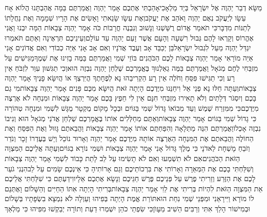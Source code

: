 \documentclass[../main/main.tex]{subfiles}
\begin{document}
\begin{multicols*}{\ncols}
מַשָּׂא דְבַר יַהְוֶה אֶל יִשְׂרָאֵל בְּיַד מַלְאָכִי\PreVerseSpace{}אָהַבְתִּי אֶתְכֶם אָמַר יַהְוֶה וַאֲמַרְתֶּם בַּמָּה אֲהַבְתָּנוּ הֲלוֹא אָח עֵשָׂו לְיַעֲקֹב נְאֻם יַהְוֶה וָאֹהַב אֶת יַעֲקֹב\PreVerseSpace{}וְאֶת עֵשָׂו שָׂנֵאתִי וָאָשִׂים אֶת הָרָיו שְׁמָמָה וְאֶת נַחֲלָתוֹ לְתַנּוֹת מִדְבָּר\PreVerseSpace{}כִּי תֹאמַר אֱדוֹם רֻשַּׁשְׁנוּ וְנָשׁוּב וְנִבְנֶה חֳרָבוֹת כֹּה אָמַר יַהְוֶה צְבָאוֹת הֵמָּה יִבְנוּ וַאֲנִי אֶהֱרוֹס וְקָרְאוּ לָהֶם גְּבוּל רִשְׁעָה וְהָעָם אֲשֶׁר זָעַם יַהְוֶה עַד עוֹלָם\PreVerseSpace{}וְעֵינֵיכֶם תִּרְאֶינָה וְאַתֶּם תֹּאמְרוּ יִגְדַּל יַהְוֶה מֵעַל לִגְבוּל יִשְׂרָאֵל\PreVerseSpace{}בֵּן יְכַבֵּד אָב וְעֶבֶד אֲדֹנָיו וְאִם אָב אָנִי אַיֵּה כְבוֹדִי וְאִם אֲדוֹנִים אָנִי אַיֵּה מוֹרָאִי אָמַר יַהְוֶה צְבָאוֹת לָכֶם הַכֹּהֲנִים בּוֹזֵי שְׁמִי וַאֲמַרְתֶּם בַּמֶּה בָזִינוּ אֶת שְׁמֶךָ\PreVerseSpace{}מַגִּישִׁים עַל מִזְבְּחִי לֶחֶם מְגֹאָל וַאֲמַרְתֶּם בַּמֶּה גֵאַלְנוּךָ בֶּאֱמָרְכֶם שֻׁלְחַן יַהְוֶה נִבְזֶה הוּא\PreVerseSpace{}וְכִי תַגִּשׁוּן עִוֵּר לִזְבֹּחַ אֵין רָע וְכִי תַגִּישׁוּ פִּסֵּחַ וְחֹלֶה אֵין רָע הַקְרִיבֵהוּ נָא לְפֶחָתֶךָ הֲיִּרְצְךָ אוֹ הֲיִשָּׂא פָנֶיךָ אָמַר יַהְוֶה צְבָאוֹת\PreVerseSpace{}וְעַתָּה חַלּוּ נָא פְנֵי אֵל וִיחֵנֵּנוּ מִיֶּדְכֶם הָיְתָה זֹּאת הֲיִשָּׂא מִכֶּם פָּנִים אָמַר יַהְוֶה צְבָאוֹת\PreVerseSpace{}מִי גַם בָּכֶם וְיִסְגֹּר דְּלָתַיִם וְלֹא תָאִירוּ מִזְבְּחִי חִנָּם אֵין לִי חֵפֶץ בָּכֶם אָמַר יַהְוֶה צְבָאוֹת וּמִנְחָה לֹא אֶרְצֶה מִיֶּדְכֶם\PreVerseSpace{}כִּי מִמִּזְרַח שֶׁמֶשׁ וְעַד מְבוֹאוֹ גָּדוֹל שְׁמִי בַּגּוֹיִם וּבְכָל מָקוֹם מֻקְטָר מֻגָּשׁ לִשְׁמִי וּמִנְחָה טְהוֹרָה כִּי גָדוֹל שְׁמִי בַּגּוֹיִם אָמַר יַהְוֶה צְבָאוֹת\PreVerseSpace{}וְאַתֶּם מְחַלְּלִים אוֹתוֹ בֶּאֱמָרְכֶם שֻׁלְחַן אֲדֹנַי מְגֹאָל הוּא וְנִיבוֹ נִבְזֶה אָכְלוֹ\PreVerseSpace{}וַאֲמַרְתֶּם הִנֵּה מַתְּלָאָה וְהִפַּחְתֶּם אוֹתוֹ אָמַר יַהְוֶה צְבָאוֹת וַהֲבֵאתֶם גָּזוּל וְאֶת הַפִּסֵּחַ וְאֶת הַחוֹלֶה וַהֲבֵאתֶם אֶת הַמִּנְחָה הַאֶרְצֶה אוֹתָהּ מִיֶּדְכֶם אָמַר יַהְוֶה \ClosedSection{}וְאָרוּר נוֹכֵל וְיֵשׁ בְּעֶדְרוֹ זָכָר וְנֹדֵר וְזֹבֵחַ מָשְׁחָת לַאדֹנָי כִּי מֶלֶךְ גָּדוֹל אָנִי אָמַר יַהְוֶה צְבָאוֹת וּשְׁמִי נוֹרָא בַגּוֹיִם\PreChapterSpace{}וְעַתָּה אֲלֵיכֶם הַמִּצְוָה הַזֹּאת הַכֹּהֲנִים\PreVerseSpace{}אִם לֹא תִשְׁמְעוּ וְאִם לֹא תָשִׂימוּ עַל לֵב לָתֵת כָּבוֹד לִשְׁמִי אָמַר יַהְוֶה צְבָאוֹת וְשִׁלַּחְתִּי בָכֶם אֶת הַמְּאֵרָה וְאָרוֹתִי אֶת בִּרְכוֹתֵיכֶם וְגַם אָרוֹתִיהָ כִּי אֵינְכֶם שָׂמִים עַל לֵב\PreVerseSpace{}הִנְנִי גֹעֵר לָכֶם אֶת הַזֶּרַע וְזֵרִיתִי פֶרֶשׁ עַל פְּנֵיכֶם פֶּרֶשׁ חַגֵּיכֶם וְנָשָׂא אֶתְכֶם אֵלָיו\PreVerseSpace{}וִידַעְתֶּם כִּי שִׁלַּחְתִּי אֲלֵיכֶם אֵת הַמִּצְוָה הַזֹּאת לִהְיוֹת בְּרִיתִי אֶת לֵוִי אָמַר יַהְוֶה צְבָאוֹת\PreVerseSpace{}בְּרִיתִי הָיְתָה אִתּוֹ הַחַיִּים וְהַשָּׁלוֹם וָאֶתְּנֵם לוֹ מוֹרָא וַיִּירָאֵנִי וּמִפְּנֵי שְׁמִי נִחַת הוּא\PreVerseSpace{}תּוֹרַת אֱמֶת הָיְתָה בְּפִיהוּ וְעַוְלָה לֹא נִמְצָא בִשְׂפָתָיו בְּשָׁלוֹם וּבְמִישׁוֹר הָלַךְ אִתִּי וְרַבִּים הֵשִׁיב מֵעָוֺן\PreVerseSpace{}כִּי שִׂפְתֵי כֹהֵן יִשְׁמְרוּ דַעַת וְתוֹרָה יְבַקְשׁוּ מִפִּיהוּ כִּי מַלְאַךְ 
\end{multicols*}
\end{document}
